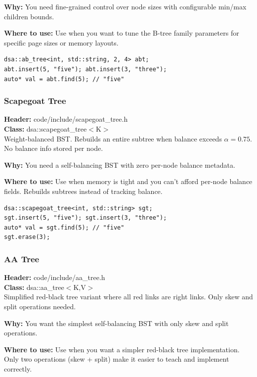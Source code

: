 \documentclass[11pt]{article}
\begin{document}
\textbf{Why:} You need fine-grained control over node sizes with configurable min/max children bounds. \par \textbf{Where to use:} Use when you want to tune the B-tree family parameters for specific page sizes or memory layouts.

\begin{lstlisting}
dsa::ab_tree<int, std::string, 2, 4> abt;
abt.insert(5, "five"); abt.insert(3, "three");
auto* val = abt.find(5); // "five"
\end{lstlisting}

\subsubsection{Scapegoat Tree}
\textbf{Header:} code/include/scapegoat\_tree.h\\
\textbf{Class:} dsa::scapegoat\_tree$<$K$>$\\

Weight-balanced BST. Rebuilds an entire subtree when balance exceeds $\alpha = 0.75$. No balance info stored per node.

\textbf{Why:} You need a self-balancing BST with zero per-node balance metadata. \par \textbf{Where to use:} Use when memory is tight and you can't afford per-node balance fields. Rebuilds subtrees instead of tracking balance.

\begin{lstlisting}
dsa::scapegoat_tree<int, std::string> sgt;
sgt.insert(5, "five"); sgt.insert(3, "three");
auto* val = sgt.find(5); // "five"
sgt.erase(3);
\end{lstlisting}

\subsubsection{AA Tree}
\textbf{Header:} code/include/aa\_tree.h\\
\textbf{Class:} dsa::aa\_tree$<$K,V$>$\\

Simplified red-black tree variant where all red links are right links. Only skew and split operations needed.

\textbf{Why:} You want the simplest self-balancing BST with only skew and split operations. \par \textbf{Where to use:} Use when you want a simpler red-black tree implementation. Only two operations (skew + split) make it easier to teach and implement correctly.
\end{document}

